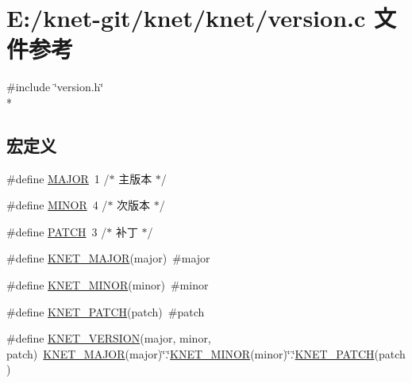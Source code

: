 \hypertarget{a00080}{}\section{E\+:/knet-\/git/knet/knet/version.c 文件参考}
\label{a00080}
{\ttfamily \#include \char`\"{}version.\+h\char`\"{}}\\*
\subsection*{宏定义}
\begin{DoxyCompactItemize}
\item 
\#define \hyperlink{a00080_a877cce34f3e58fd7f9194fab90724cb8_a877cce34f3e58fd7f9194fab90724cb8}{M\+A\+J\+O\+R}~1 /$\ast$ 主版本 $\ast$/
\item 
\#define \hyperlink{a00080_a4e10915d93013542d442d78de0e02e9a_a4e10915d93013542d442d78de0e02e9a}{M\+I\+N\+O\+R}~4 /$\ast$ 次版本 $\ast$/
\item 
\#define \hyperlink{a00080_af59c44c1f3ff875c35393428624473aa_af59c44c1f3ff875c35393428624473aa}{P\+A\+T\+C\+H}~3 /$\ast$ 补丁 $\ast$/
\item 
\#define \hyperlink{a00080_ad4c134c968cc4fc0cc700567eb39c675_ad4c134c968cc4fc0cc700567eb39c675}{K\+N\+E\+T\+\_\+\+M\+A\+J\+O\+R}(major)~\#major
\item 
\#define \hyperlink{a00080_a70224fafcaea5102f9cd726ba926684f_a70224fafcaea5102f9cd726ba926684f}{K\+N\+E\+T\+\_\+\+M\+I\+N\+O\+R}(minor)~\#minor
\item 
\#define \hyperlink{a00080_ae9af7a95a483a187a37d3e9828c6ac1c_ae9af7a95a483a187a37d3e9828c6ac1c}{K\+N\+E\+T\+\_\+\+P\+A\+T\+C\+H}(patch)~\#patch
\item 
\#define \hyperlink{a00080_a96eb274e34ccfa0c0505ca99f2e09a82_a96eb274e34ccfa0c0505ca99f2e09a82}{K\+N\+E\+T\+\_\+\+V\+E\+R\+S\+I\+O\+N}(major,  minor,  patch)~\hyperlink{a00080_ad4c134c968cc4fc0cc700567eb39c675_ad4c134c968cc4fc0cc700567eb39c675}{K\+N\+E\+T\+\_\+\+M\+A\+J\+O\+R}(major)\char`\"{}.\char`\"{}\hyperlink{a00080_a70224fafcaea5102f9cd726ba926684f_a70224fafcaea5102f9cd726ba926684f}{K\+N\+E\+T\+\_\+\+M\+I\+N\+O\+R}(minor)\char`\"{}.\char`\"{}\hyperlink{a00080_ae9af7a95a483a187a37d3e9828c6ac1c_ae9af7a95a483a187a37d3e9828c6ac1c}{K\+N\+E\+T\+\_\+\+P\+A\+T\+C\+H}(patch)
\end{DoxyCompactItemize}
